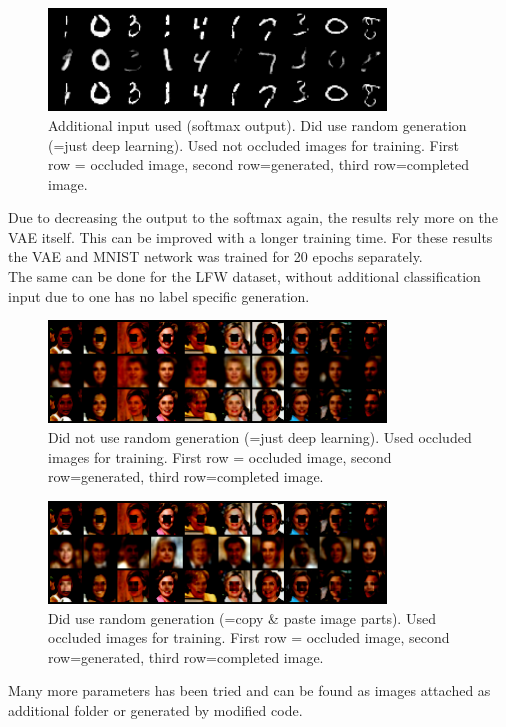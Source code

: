 \documentclass[
     11pt,         %
     a4paper,      %
     oneside,
     ]{article}
\begin{document}
\begin{figure}[H]
  \begin{center}
    \includegraphics[width=0.8\textwidth]{presentation_results/VAE/MNIST-VAE-useRandom_true-useMNIST_true-VAERepresentation_3-useOccludedForTrain_false.png}
    \caption{Additional input used (softmax output). Did use random generation (=just deep learning). Used not occluded images for training. First row = occluded image, second row=generated, third row=completed image.}
  \end{center}
\end{figure}
Due to decreasing the output to the softmax again, the results rely more on the VAE itself. This can be improved with a longer training time. For these results the VAE and MNIST network was trained for 20 epochs separately.\\
The same can be done for the LFW dataset, without additional classification input due to one has no label specific generation.
\begin{figure}[H]
  \begin{center}
    \includegraphics[width=0.8\textwidth]{presentation_results/VAE/LFW-VAE-useRandom_false-useOccludedForTrain_True.png}
    \caption{Did not use random generation (=just deep learning). Used occluded images for training.  First row = occluded image, second row=generated, third row=completed image.}
  \end{center}
\end{figure}
\begin{figure}[H]
  \begin{center}
    \includegraphics[width=0.8\textwidth]{presentation_results/VAE/LFW-VAE-useRandom_True-useOccludedForTrain_False.png}
    \caption{Did use random generation (=copy \& paste image parts). Used occluded images for training.  First row = occluded image, second row=generated, third row=completed image.}
  \end{center}
\end{figure}
 Many more parameters has been tried and can be found as images attached as additional folder or generated by modified code.
\end{document}
